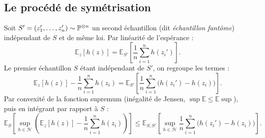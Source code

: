 \subsection{Le procédé de symétrisation}

\begin{proposition}
    Soit $S' = (z_1', \dots, z_n') \sim \mathbb{P}^{\otimes n}$ un second échantillon (dit \emph{échantillon fantôme}) indépendant de $S$ et de même loi. Par linéarité de l'espérance :
    \begin{equation}
        \mathbb{E}_z[h(z)] = \mathbb{E}_{S'} \left[ \frac{1}{n} \sum_{i=1}^n h(z_i') \right].
    \end{equation}
    Le premier échantillon $S$ étant indépendant de $S'$, on regroupe les termes :
    \begin{equation}
        \mathbb{E}_z[h(z)] - \frac{1}{n} \sum_{i=1}^n h(z_i) = \mathbb{E}_{S'} \left[ \frac{1}{n} \sum_{i=1}^n \big(h(z_i') - h(z_i)\big) \right].
    \end{equation}
    Par convexité de la fonction supremum (inégalité de Jensen, $\sup \mathbb{E} \leqslant \mathbb{E} \sup$), puis en intégrant par rapport à $S$ :
    \begin{equation}
        \mathbb{E}_S \left[ \sup_{h \in \mathcal{H}} \left( \mathbb{E}_z[h(z)] - \frac{1}{n} \sum_{i=1}^n h(z_i) \right) \right] \leqslant \mathbb{E}_{S, S'} \left[ \sup_{h \in \mathcal{H}} \frac{1}{n} \sum_{i=1}^n \big(h(z_i') - h(z_i)\big) \right].
    \end{equation}
\end{proposition}

